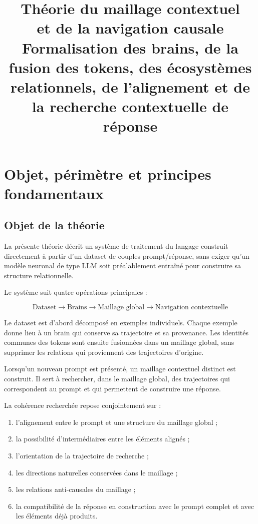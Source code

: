 \documentclass[11pt,a4paper]{report}
\title{
  \textbf{Théorie du maillage contextuel}\\
  \textbf{et de la navigation causale}\\[0.6em]
  \large Formalisation des brains, de la fusion des tokens,
  des écosystèmes relationnels, de l'alignement et de la recherche
  contextuelle de réponse
}
\author{}
\date{}
\theoremstyle{definition}
\theoremstyle{plain}
\theoremstyle{remark}
\begin{document}
\maketitle
\tableofcontents

\chapter{Objet, périmètre et principes fondamentaux}

\section{Objet de la théorie}

La présente théorie décrit un système de traitement du langage
construit directement à partir d'un dataset de couples
prompt/réponse, sans exiger qu'un modèle neuronal de type LLM
soit préalablement entraîné pour construire sa structure
relationnelle.

Le système suit quatre opérations principales :

\[
\boxed{
\text{Dataset}
\longrightarrow
\text{Brains}
\longrightarrow
\text{Maillage global}
\longrightarrow
\text{Navigation contextuelle}
}
\]

Le dataset est d'abord décomposé en exemples individuels.
Chaque exemple donne lieu à un brain qui conserve sa trajectoire
et sa provenance. Les identités communes des tokens sont ensuite
fusionnées dans un maillage global, sans supprimer les relations
qui proviennent des trajectoires d'origine.

Lorsqu'un nouveau prompt est présenté, un maillage contextuel
distinct est construit. Il sert à rechercher, dans le maillage
global, des trajectoires qui correspondent au prompt et qui
permettent de construire une réponse.

La cohérence recherchée repose conjointement sur :

\begin{enumerate}[label=\arabic*.]
  \item l'alignement entre le prompt et une structure du maillage
        global ;
  \item la possibilité d'intermédiaires entre les éléments alignés ;
  \item l'orientation de la trajectoire de recherche ;
  \item les directions naturelles conservées dans le maillage ;
  \item les relations anti-causales du maillage ;
  \item la compatibilité de la réponse en construction avec le
        prompt complet et avec les éléments déjà produits.
\end{enumerate}
\end{document}
